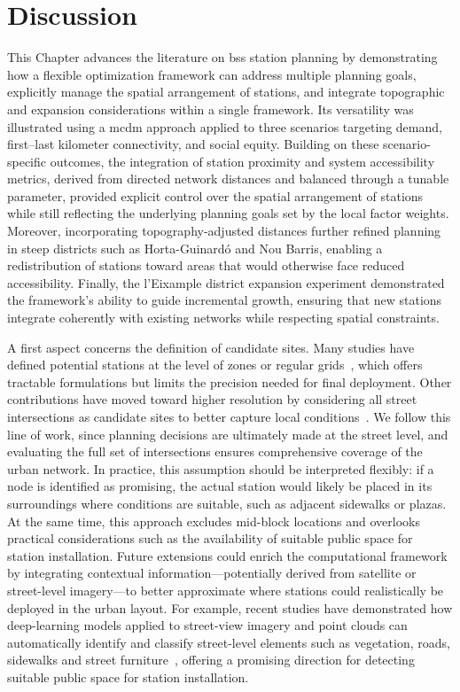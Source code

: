 \section{Discussion}
\label{sec:disc_stations}

This Chapter advances the literature on \ac{bss} station planning by demonstrating how a flexible optimization framework can address multiple planning goals, explicitly manage the spatial arrangement of stations, and integrate topographic and expansion considerations within a single framework. Its versatility was illustrated using a \ac{mcdm} approach applied to three scenarios targeting demand, first–last kilometer connectivity, and social equity. Building on these scenario-specific outcomes, the integration of station proximity and system accessibility metrics, derived from directed network distances and balanced through a tunable parameter, provided explicit control over the spatial arrangement of stations while still reflecting the underlying planning goals set by the local factor weights. Moreover, incorporating topography-adjusted distances further refined planning in steep districts such as Horta-Guinardó and Nou Barris, enabling a redistribution of stations toward areas that would otherwise face reduced accessibility. Finally, the l’Eixample district expansion experiment demonstrated the framework’s ability to guide incremental growth, ensuring that new stations integrate coherently with existing networks while respecting spatial constraints.

A first aspect concerns the definition of candidate sites. Many studies have defined potential stations at the level of zones or regular grids~\cite{Frade2015, Mete2018, Fazio2021, Veillette2018, Tera2023}, which offers tractable formulations but limits the precision needed for final deployment. Other contributions have moved toward higher resolution by considering all street intersections as candidate sites to better capture local conditions~\cite{Cintrano2018, Xin2013}. We follow this line of work, since planning decisions are ultimately made at the street level, and evaluating the full set of intersections ensures comprehensive coverage of the urban network. In practice, this assumption should be interpreted flexibly: if a node is identified as promising, the actual station would likely be placed in its surroundings where conditions are suitable, such as adjacent sidewalks or plazas. At the same time, this approach excludes mid-block locations and overlooks practical considerations such as the availability of suitable public space for station installation. Future extensions could enrich the computational framework by integrating contextual information—potentially derived from satellite or street-level imagery—to better approximate where stations could realistically be deployed in the urban layout. For example, recent studies have demonstrated how deep-learning models applied to street-view imagery and point clouds can automatically identify and classify street-level elements such as vegetation, roads, sidewalks and street furniture~\cite{Ning2022, Zhou2022}, offering a promising direction for detecting suitable public space for station installation.

